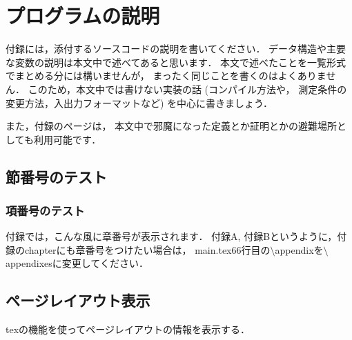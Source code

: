 \chapter{プログラムの説明}
\label{sec:appendix}

付録には，添付するソースコードの説明を書いてください．
データ構造や主要な変数の説明は本文中で述べてあると思います．
本文で述べたことを一覧形式でまとめる分には構いませんが，
まったく同じことを書くのはよくありません．
このため，本文中では書けない実装の話
(コンパイル方法や， 測定条件の変更方法，入出力フォーマットなど)
を中心に書きましょう．


また，付録のページは，
本文中で邪魔になった定義とか証明とかの避難場所としても利用可能です．



\section{節番号のテスト}
\subsection{項番号のテスト}
付録では，こんな風に章番号が表示されます．
付録A, 付録Bというように，付録のchapterにも章番号をつけたい場合は，
main.tex66行目の$\setminus$appendixを$\setminus$appendixesに変更してください．


\section{ページレイアウト表示}
texの機能を使ってページレイアウトの情報を表示する．

\layout %

